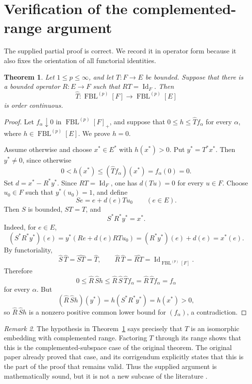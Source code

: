 \documentclass[11pt]{article}
\newtheorem{theorem}{Theorem}[section]
\theoremstyle{remark}
\newtheorem{remark}[theorem]{Remark}
\newcommand{\FBL}[2]{\operatorname{FBL}^{(#1)}[#2]}
\newcommand{\Id}{\operatorname{Id}}
\newcommand{\wh}[1]{\widehat{#1}}
\begin{document}
\section{Verification of the complemented-range argument}

The supplied partial proof is correct.  We record it in operator form because
it also fixes the orientation of all functorial identities.

\begin{theorem}\label{thm:leftinverse}
Let \(1\le p\le\infty\), and let \(T:F\to E\) be bounded.  Suppose that
there is a bounded operator \(R:E\to F\) such that
\(RT=\Id_F\).  Then
\[
  \wh T:\FBL{p}{F}\longrightarrow\FBL{p}{E}
\]
is order continuous.
\end{theorem}

\begin{proof}
Let \(f_\alpha\downarrow0\) in \(\FBL{p}{F}_+\), and suppose that
\(0\le h\le\wh T f_\alpha\) for every \(\alpha\), where
\(h\in\FBL{p}{E}\).  We prove \(h=0\).

Assume otherwise and choose \(x^*\in E^*\) with \(h(x^*)>0\).  Put
\(y^*=T^*x^*\).  Then \(y^*\ne0\), since otherwise
\[
  0<h(x^*)\le (\wh T f_\alpha)(x^*)=f_\alpha(0)=0.
\]
Set \(d=x^*-R^*y^*\).  Since \(RT=\Id_F\), one has
\(d(Tu)=0\) for every \(u\in F\).  Choose \(u_0\in F\) such that
\(y^*(u_0)=1\), and define
\[
  Se=e+d(e)Tu_0 \qquad(e\in E).
\]
Then \(S\) is bounded, \(ST=T\), and
\[
  S^*R^*y^*=x^*.
\]
Indeed, for \(e\in E\),
\[
  (S^*R^*y^*)(e)
   =y^*(Re+d(e)RTu_0)
   =(R^*y^*)(e)+d(e)=x^*(e).
\]
By functoriality,
\[
  \wh S\,\wh T=\widehat{ST}=\wh T,
  \qquad
  \wh R\,\wh T=\widehat{RT}=\Id_{\FBL{p}{F}}.
\]
Therefore
\[
  0\le \wh R\,\wh S h
  \le \wh R\,\wh S\,\wh T f_\alpha
  =\wh R\,\wh T f_\alpha=f_\alpha
\]
for every \(\alpha\).  But
\[
  (\wh R\,\wh S h)(y^*)=h(S^*R^*y^*)=h(x^*)>0,
\]
so \(\wh R\,\wh S h\) is a nonzero positive common lower bound for
\((f_\alpha)\), a contradiction.
\end{proof}

\begin{remark}\label{rem:duplicate}
The hypothesis in Theorem~\ref{thm:leftinverse} says precisely that \(T\) is
an isomorphic embedding with complemented range.  Factoring \(T\) through
its range shows that this is the complemented-subspace case of the original
theorem.  The original paper already proved that case, and its corrigendum
explicitly states that this is the part of the proof that remains valid.
Thus the supplied argument is mathematically sound, but it is not a new
subcase of the literature \cite{Corr}.
\end{remark}
\end{document}
